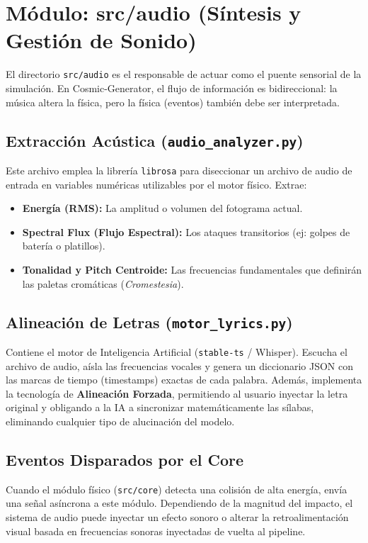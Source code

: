 \documentclass[12pt]{article}
\begin{document}
\section{Módulo: src/audio (Síntesis y Gestión de Sonido)}

El directorio \texttt{src/audio} es el responsable de actuar como el puente sensorial de la simulación. En Cosmic-Generator, el flujo de información es bidireccional: la música altera la física, pero la física (eventos) también debe ser interpretada.

\subsection{Extracción Acústica (\texttt{audio\_analyzer.py})}
Este archivo emplea la librería \texttt{librosa} para diseccionar un archivo de audio de entrada en variables numéricas utilizables por el motor físico. Extrae:
\begin{itemize}
    \item \textbf{Energía (RMS):} La amplitud o volumen del fotograma actual.
    \item \textbf{Spectral Flux (Flujo Espectral):} Los ataques transitorios (ej: golpes de batería o platillos).
    \item \textbf{Tonalidad y Pitch Centroide:} Las frecuencias fundamentales que definirán las paletas cromáticas (\textit{Cromestesia}).
\end{itemize}

\subsection{Alineación de Letras (\texttt{motor\_lyrics.py})}
Contiene el motor de Inteligencia Artificial (\texttt{stable-ts} / Whisper). Escucha el archivo de audio, aísla las frecuencias vocales y genera un diccionario JSON con las marcas de tiempo (timestamps) exactas de cada palabra. Además, implementa la tecnología de \textbf{Alineación Forzada}, permitiendo al usuario inyectar la letra original y obligando a la IA a sincronizar matemáticamente las sílabas, eliminando cualquier tipo de alucinación del modelo.

\subsection{Eventos Disparados por el Core}
Cuando el módulo físico (\texttt{src/core}) detecta una colisión de alta energía, envía una señal asíncrona a este módulo. Dependiendo de la magnitud del impacto, el sistema de audio puede inyectar un efecto sonoro o alterar la retroalimentación visual basada en frecuencias sonoras inyectadas de vuelta al pipeline.
\end{document}
